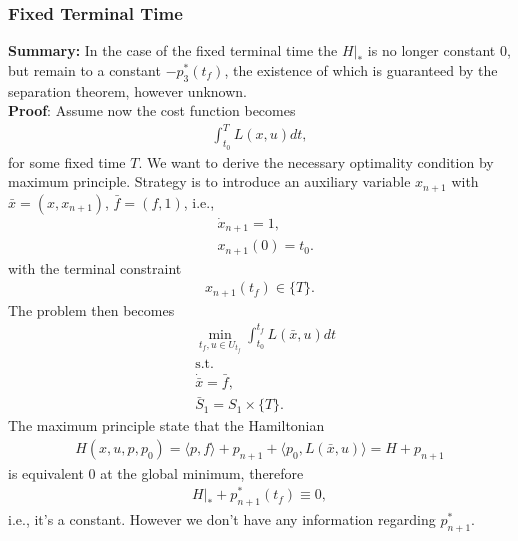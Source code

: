 \documentclass[a4paper,11pt,fleqn]{book}
\theoremstyle{definition}
\theoremstyle{remark}
\begin{document}
\subsubsection{Fixed Terminal Time}
\textbf{Summary:} In the case of the fixed terminal time the $H|_*$ is no longer constant 0, but remain to a constant $-p_3^*(t_f)$, the existence of which is guaranteed by the separation theorem, however unknown.\\
\textbf{Proof}: Assume now the cost function becomes
\begin{align*}
	\int_{t_0}^T L(x, u) dt,
\end{align*}
for some fixed time $T$. We want to derive the necessary optimality condition by maximum principle. Strategy is to introduce an auxiliary variable $x_{n + 1} $ with $\bar{x} = (x, x_{n + 1})$, $\bar{f} = (f, 1)$, i.e.,  
\begin{align*}
	&\dot{x}_{n+1} = 1,\\
	&x_{n + 1}(0) = t_0. 
\end{align*}
with the terminal constraint
\begin{align*}
	x_{n+1}(t_f) \in \{T \}.
\end{align*}
The problem then becomes
\begin{align*}
	& \min_{t_f, u \in U_{t_f}} \int_{t_0}^{t_f}L(\bar{x}, u) dt \\
	& \text{s.t.}\\
	& \dot{\bar{x}} = \bar{f}, \\
	& \bar{S}_1 = S_1 \times \{T\}. 
\end{align*}
The maximum principle state that the Hamiltonian
\begin{align*}
	H(x, u, p, p_0) = \langle p, f \rangle + p_{n + 1} + \langle p_0, L(\bar{x}, u) \rangle = H + p_{n + 1} 
\end{align*}
is equivalent 0 at the global minimum, therefore
\begin{align*}
	H|_* + p^*_{n + 1}(t_f) \equiv 0, 
\end{align*} 
i.e., it's a constant. However we don't have any information regarding $p_{n + 1}^*$. 
\end{document}
